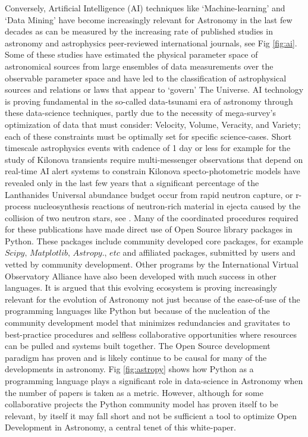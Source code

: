 \documentclass[final,5p,times,twocolumn,authoryear]{elsarticle}
\begin{document}
Conversely, Artificial Intelligence (AI) techniques like `Machine-learning' and `Data Mining'  have become increasingly relevant for Astronomy in the last few decades as can be measured by the increasing rate of published studies in astronomy and astrophysics peer-reviewed international journals, see Fig \ref{fig:ai}. Some of these studies have estimated the physical parameter space of astronomical sources from large ensembles of data measurements over the observable parameter space and have led to the classification of astrophysical sources and relations or laws that appear to `govern' The Universe. AI technology is proving fundamental in the so-called data-tsunami era of astronomy through these data-science techniques, partly due to the necessity of mega-survey's optimization of data that must consider: Velocity, Volume, Veracity, and Variety; each of these constraints must be optimally set for specific science-cases. Short timescale astrophysics events with cadence of 1 day or less for example for the study of Kilonova transients require multi-messenger observations that depend on real-time AI alert systems to constrain Kilonova specto-photometric models have revealed only in the last few years that a significant percentage of the Lanthanides Universal abundance budget occur from rapid neutron capture, or r-process nucleosynthesis reactions of neutron-rich material in 
 ejecta caused by the collision of two neutron stars, see \cite{artola2020}. Many of the coordinated procedures required for these publications have made direct use of Open Source library packages in Python. These packages include community developed core packages, for example $\textit{Scipy, Matplotlib, Astropy., etc}$  and affiliated packages, submitted by users and vetted by community development. Other programs by the International Virtual Observatory Alliance have also been developed with much success in other languages. It is argued that this evolving ecosystem is proving increasingly relevant for the evolution of Astronomy not just because of the ease-of-use of the programming languages like Python but because of the nucleation of the community development model that minimizes redundancies and gravitates to best-practice procedures and selfless collaborative opportunities where resources can be pulled and systems built together. The Open Source development paradigm has proven and is likely continue to be causal for many of the developments in astronomy. Fig \ref{fig:astropy} shows how Python as a programming language plays a significant role in data-science in Astronomy when the number of papers is taken as a metric.  However, although for some collaborative projects the Python community model has proven itself to be relevant, by itself it may fall short and not be sufficient a tool to optimize Open Development in Astronomy, a central tenet of this white-paper.
\end{document}

